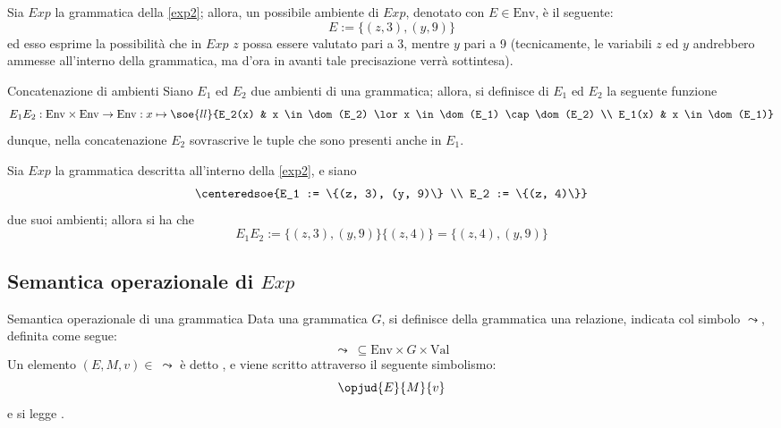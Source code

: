 \documentclass[a4paper, 12pt]{report}
\begin{document}
    \begin{example}
        Sia $Exp$ la grammatica della \cref{exp2}; allora, un possibile ambiente di $Exp$, denotato con $E \in \mathrm{Env}$, è il seguente: $$E := \{(z,3), (y, 9) \}$$ ed esso esprime la possibilità che in $Exp$ $z$ possa essere valutato pari a 3, mentre $y$ pari a 9 (tecnicamente, le variabili $z$ ed $y$ andrebbero ammesse all'interno della grammatica, ma d'ora in avanti tale precisazione verrà sottintesa).
    \end{example}

    \begin{frameddefn}{Concatenazione di ambienti}
        Siano $E_1$ ed $E_2$ due ambienti di una grammatica; allora, si definisce  di $E_1$ ed $E_2$ la seguente funzione $$E_1E_2: \mathrm{Env} \times \mathrm{Env} \to \mathrm{Env} : x \mapsto \soe{ll}{E_2(x) & x \in \dom(E_2) \lor x \in \dom(E_1) \cap \dom(E_2) \\ E_1(x) & x \in \dom(E_1)}$$ dunque, nella concatenazione $E_2$ sovrascrive le tuple che sono presenti anche in $E_1$.
    \end{frameddefn}

    \begin{example}
        Sia $Exp$ la grammatica descritta all'interno della \cref{exp2}, e siano $$\centeredsoe{E_1 := \{(z, 3), (y, 9)\} \\ E_2 := \{(z, 4)\}}$$ due suoi ambienti; allora si ha che $$E_1E_2 := \{(z, 3), (y, 9)\}\{(z, 4)\} = \{(z, 4), (y, 9)\}$$
    \end{example}

    \subsection{Semantica operazionale di $Exp$}

    \begin{frameddefn}[label={sem opexp}]{Semantica operazionale di una grammatica}
        Data una grammatica $G$, si definisce  della grammatica una relazione, indicata col simbolo $\leadsto$, definita come segue: $$\leadsto \ \subseteq \mathrm{Env} \times G \times \mathrm{Val}$$
        Un elemento $(E, M, v) \in \ \leadsto$ è detto , e viene scritto attraverso il seguente simbolismo: $$\opjud{E}{M}{v}$$ e si legge .
    \end{frameddefn}
\end{document}
